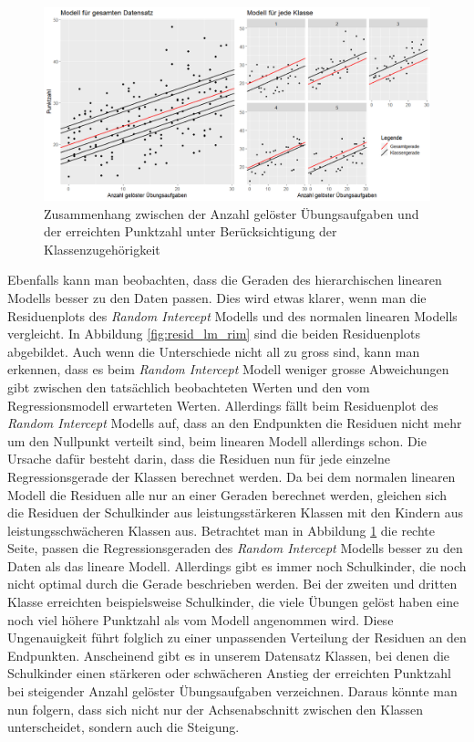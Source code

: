 \documentclass[12pt]{article}\usepackage[]{graphicx}\usepackage[]{color}
\begin{document}
\begin{figure}[t!]
\centering
\includegraphics[width = \textwidth]{random_intercept}
\caption{Zusammenhang zwischen der Anzahl gelöster Übungsaufgaben und der erreichten Punktzahl unter Berücksichtigung der Klassenzugehörigkeit}
\label{fig:random_intercept}
\end{figure}

Ebenfalls kann man beobachten, dass die Geraden des hierarchischen linearen Modells besser zu den Daten passen. Dies wird etwas klarer, wenn man die Residuenplots des \textit{Random Intercept} Modells und des normalen linearen Modells vergleicht. In Abbildung \ref{fig:resid_lm_rim} sind die beiden Residuenplots abgebildet. Auch wenn die Unterschiede nicht all zu gross sind, kann man erkennen, dass es beim \textit{Random Intercept} Modell weniger grosse Abweichungen gibt zwischen den tatsächlich beobachteten Werten und den vom Regressionsmodell erwarteten Werten. Allerdings fällt beim Residuenplot des \textit{Random Intercept} Modells auf, dass an den Endpunkten die Residuen nicht mehr um den Nullpunkt verteilt sind, beim linearen Modell allerdings schon. Die Ursache dafür besteht darin, dass die Residuen nun für jede einzelne Regressionsgerade der Klassen berechnet werden. Da bei dem normalen linearen Modell die Residuen alle nur an einer Geraden berechnet werden, gleichen sich die Residuen der Schulkinder aus leistungsstärkeren Klassen mit den Kindern aus leistungsschwächeren Klassen aus. Betrachtet man in Abbildung \ref{fig:random_intercept} die rechte Seite, passen die Regressionsgeraden des \textit{Random Intercept} Modells besser zu den Daten als das lineare Modell. Allerdings gibt es immer noch Schulkinder, die noch nicht optimal durch die Gerade beschrieben werden. Bei der zweiten und dritten Klasse erreichten beispielsweise Schulkinder, die viele Übungen gelöst haben eine noch viel höhere Punktzahl als vom Modell angenommen wird. Diese Ungenauigkeit führt folglich zu einer unpassenden Verteilung der Residuen an den Endpunkten. Anscheinend gibt es in unserem Datensatz Klassen, bei denen die Schulkinder einen stärkeren oder schwächeren Anstieg der erreichten Punktzahl bei steigender Anzahl gelöster Übungsaufgaben verzeichnen. Daraus könnte man nun folgern, dass sich nicht nur der Achsenabschnitt zwischen den Klassen unterscheidet, sondern auch die Steigung.
\end{document}
